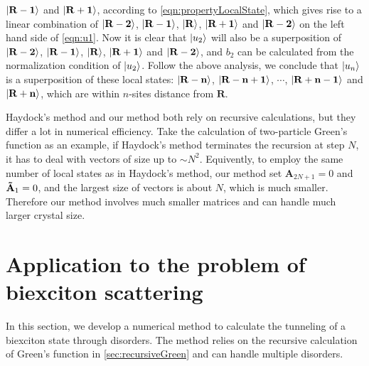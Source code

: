 $|  \mathbf{R-1} \rangle$ and $|  \mathbf{R+1} \rangle$, according to
 \autoref{eqn:propertyLocalState}, which gives rise to a linear combination of $|  \mathbf{R-2} \rangle$, 
$|  \mathbf{R-1} \rangle$, $|  \mathbf{R} \rangle$, $|  \mathbf{R+1} \rangle$ and $|  \mathbf{R-2} \rangle$ on the left hand side
 of \autoref{eqn:u1}. Now it is clear that $| u_2 \rangle$ will also be a superposition of $|  \mathbf{R-2} \rangle$, 
$|  \mathbf{R-1} \rangle$, $|  \mathbf{R} \rangle$, $|  \mathbf{R+1} \rangle$ and $|  \mathbf{R-2} \rangle$, and $b_2$ can be
calculated from the normalization condition of $| u_2 \rangle$. Follow the above analysis, we conclude that 
$| u_n \rangle$ is a superposition of these local states: $|  \mathbf{R-n} \rangle$, 
$|  \mathbf{R-n+1} \rangle$, $\cdots$, $|  \mathbf{R+n-1} \rangle$ and $|  \mathbf{R+n} \rangle$, which are within $n$-sites
distance from $\mathbf{R}$. 

Haydock's method and our method both rely on recursive calculations, but they differ a lot in numerical efficiency. 
Take the calculation of two-particle Green's function as an example,  if Haydock's 
method terminates the recursion at step $N$, it has to deal with vectors of size up to $\sim N^2$. 
Equivently, to employ 
the same number of local states as in Haydock's method, our method set $\mathbf{A}_{2N+1}=0$ and
 $\mathbf{\Tilde{A} }_{1}=0$, and the largest size of vectors is about $N$, which is much smaller. Therefore
our method involves much smaller matrices and can handle much larger crystal size. 




\section{Application to the problem of biexciton scattering}
\label{sec:biexcitonScattering}

In this section, we develop a numerical method to calculate the tunneling of a biexciton state through disorders. The 
method relies on the recursive calculation of Green's function in \autoref{sec:recursiveGreen} and can handle multiple
disorders. 

